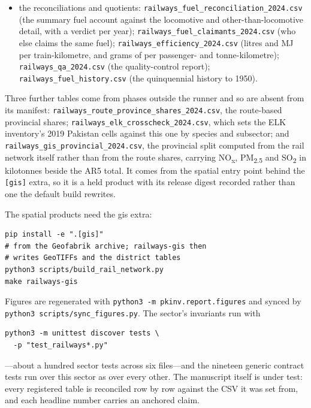 \begin{itemize}
\item the reconciliations and quotients: \texttt{railways\_\allowbreak fuel\_\allowbreak reconciliation\_\allowbreak 2024.csv} (the summary fuel account against the locomotive and other-than-locomotive detail, with a verdict per year); \texttt{railways\_\allowbreak fuel\_\allowbreak claimants\_\allowbreak 2024.csv} (who else claims the same fuel); \texttt{railways\_\allowbreak efficiency\_\allowbreak 2024.csv} (litres and MJ per train-kilometre, and grams of \COtwo{} per passenger- and tonne-kilometre); \texttt{railways\_\allowbreak qa\_\allowbreak 2024.csv} (the quality-control report); \texttt{railways\_\allowbreak fuel\_\allowbreak history.csv} (the quinquennial history to 1950).
\end{itemize}

Three further tables come from phases outside the runner and so are absent from its manifest:
\texttt{railways\_\allowbreak route\_\allowbreak province\_\allowbreak shares\_\allowbreak 2024.csv},
the route-based provincial shares;
\texttt{railways\_\allowbreak elk\_\allowbreak crosscheck\_\allowbreak 2024.csv}, which
sets the ELK inventory's 2019 Pakistan cells against this one by species and subsector; and
\texttt{railways\_\allowbreak gis\_\allowbreak provincial\_\allowbreak 2024.csv}, the provincial split computed
from the rail network itself rather than from the route shares, carrying NO\textsubscript{x},
PM\textsubscript{2.5} and SO\textsubscript{2} in kilotonnes beside the AR5 total. It comes from
the spatial entry point behind the \texttt{[gis]} extra, so it is a held product with its
release digest recorded rather than one the default build rewrites.

The spatial products need the gis extra:

\begin{verbatim}
pip install -e ".[gis]"
# from the Geofabrik archive; railways-gis then
# writes GeoTIFFs and the district tables
python3 scripts/build_rail_network.py
make railways-gis
\end{verbatim}

Figures are regenerated with \texttt{python3 -m pkinv.report.figures} and synced by
\texttt{python3 scripts/sync\_figures.py}. The sector's invariants run with

\begin{verbatim}
python3 -m unittest discover tests \
  -p "test_railways*.py"
\end{verbatim}

---about a hundred sector tests across six files---and the nineteen generic contract
tests run over this sector as over every other. The manuscript itself is under test:
every registered table is reconciled row by row against the CSV it was set from, and
each headline number carries an anchored claim.

